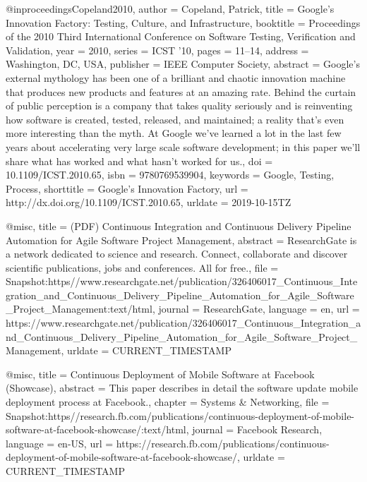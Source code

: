 @inproceedings{Copeland2010,
  author     = {Copeland, Patrick},
  title      = {Google's {Innovation} {Factory}: {Testing}, {Culture}, and {Infrastructure}},
  booktitle  = {Proceedings of the 2010 {Third} {International} {Conference} on {Software} {Testing}, {Verification} and {Validation}},
  year       = {2010},
  series     = {{ICST} '10},
  pages      = {11--14},
  address    = {Washington, DC, USA},
  publisher  = {IEEE Computer Society},
  abstract   = {Google’s external mythology has been one of a brilliant and chaotic innovation machine that produces new products and features at an amazing rate. Behind the curtain of public perception is a company that takes quality seriously and is reinventing how software is created, tested, released, and maintained; a reality that’s even more interesting than the myth. At Google we’ve learned a lot in the last few years about accelerating very large scale software development; in this paper we'll share what has worked and what hasn't worked for us.},
  doi        = {10.1109/ICST.2010.65},
  isbn       = {9780769539904},
  keywords   = {Google, Testing, Process},
  shorttitle = {Google's {Innovation} {Factory}},
  url        = {http://dx.doi.org/10.1109/ICST.2010.65},
  urldate    = {2019-10-15TZ}
}

@misc{,
  title    = {({PDF}) {Continuous} {Integration} and {Continuous} {Delivery} {Pipeline} {Automation} for {Agile} {Software} {Project} {Management}},
  abstract = {ResearchGate is a network dedicated to science and research. Connect, collaborate and discover scientific publications, jobs and conferences. All for free.},
  file     = {Snapshot:https\://www.researchgate.net/publication/326406017_Continuous_Integration_and_Continuous_Delivery_Pipeline_Automation_for_Agile_Software_Project_Management:text/html},
  journal  = {ResearchGate},
  language = {en},
  url      = {https://www.researchgate.net/publication/326406017_Continuous_Integration_and_Continuous_Delivery_Pipeline_Automation_for_Agile_Software_Project_Management},
  urldate  = {CURRENT\_TIMESTAMP}
}

@misc{,
  title    = {Continuous {Deployment} of {Mobile} {Software} at {Facebook} ({Showcase})},
  abstract = {This paper describes in detail the software update mobile deployment process at Facebook.},
  chapter  = {Systems \& Networking},
  file     = {Snapshot:https\://research.fb.com/publications/continuous-deployment-of-mobile-software-at-facebook-showcase/:text/html},
  journal  = {Facebook Research},
  language = {en-US},
  url      = {https://research.fb.com/publications/continuous-deployment-of-mobile-software-at-facebook-showcase/},
  urldate  = {CURRENT\_TIMESTAMP}
}

